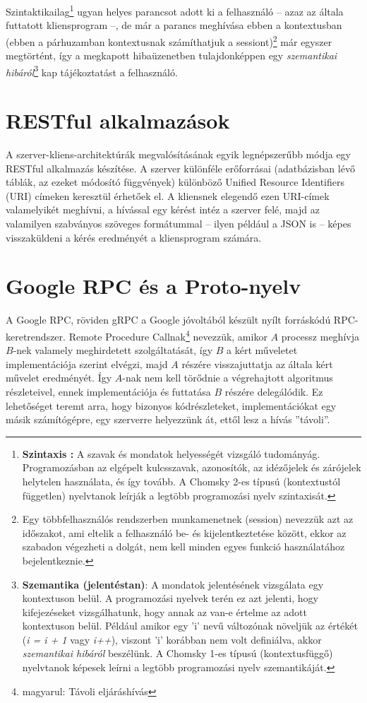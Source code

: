 \documentclass[tocnopagenum]{thesis-ekf}
\begin{document}
	Szintaktikailag\footnote{\textbf{Szintaxis :} A szavak és mondatok helyességét vizsgáló tudományág. Programozásban az elgépelt kulcsszavak, azonosítók, az idézőjelek és zárójelek helytelen használata, és így tovább. A Chomsky 2-es típusú (kontextustól független) nyelvtanok leírják a legtöbb programozási nyelv szintaxisát.} ugyan helyes parancsot adott ki a felhasználó -- azaz az általa futtatott kliensprogram --, de már a parancs meghívása ebben a kontextusban (ebben a párhuzamban kontextusnak számíthatjuk a sessiont)\footnote{Egy többfelhasználós rendszerben munkamenetnek (session) nevezzük azt az időszakot, ami eltelik a felhasználó be- és kijelentkeztetése között, ekkor az szabadon végezheti a dolgát, nem kell minden egyes funkció használatához bejelentkeznie.} már egyszer megtörtént, így a megkapott hibaüzenetben tulajdonképpen egy \textit{szemantikai hibáról}\footnote{\textbf{Szemantika (jelentéstan)}: A mondatok jelentésének vizsgálata egy kontextuson belül. A programozási nyelvek terén ez azt jelenti, hogy kifejezéseket vizsgálhatunk, hogy annak az van-e értelme az adott kontextuson belül. Például amikor egy 'i' nevű változónak növeljük az értékét (\textit{i = i + 1} vagy \textit{i++}), viszont 'i' korábban nem volt definiálva, akkor \textit{szemantikai hibáról} beszélünk. A Chomsky 1-es típusú (kontextusfüggő) nyelvtanok képesek leírni a legtöbb programozási nyelv szemantikáját.} kap tájékoztatást a felhasználó. \cite{formnyelvek}
	
	\section{RESTful alkalmazások}
	\label{rest}
	A szerver-kliens-architektúrák megvalósításának egyik legnépszerűbb módja egy RESTful alkalmazás készítése. A szerver különféle erőforrásai (adatbázisban lévő táblák, az ezeket módosító függvények) különböző Unified Resource Identifiers (URI) címeken keresztül érhetőek el. A kliensnek elegendő ezen URI-címek valamelyikét meghívni, a hívással egy kérést intéz a szerver felé, majd az valamilyen szabványos szöveges formátummal -- ilyen például a JSON is -- képes visszaküldeni a kérés eredményét a kliensprogram számára.
	
	\section{Google RPC és a Proto-nyelv}
	\label{grpc}
	A Google RPC, röviden gRPC a Google jóvoltából készült nyílt forráskódú RPC-keretrendszer. Remote Procedure Callnak\footnote{magyarul: Távoli eljáráshívás} nevezzük, amikor $A$ processz meghívja $B$-nek valamely meghirdetett szolgáltatását, így $B$ a kért műveletet implementációja szerint elvégzi, majd $A$ részére visszajuttatja az általa kért művelet eredményét. Így $A$-nak nem kell törődnie a végrehajtott algoritmus részleteivel, ennek implementációja és futtatása $B$ részére delegálódik. Ez lehetőséget teremt arra, hogy bizonyos kódrészleteket, implementációkat egy másik számítógépre, egy szerverre helyezzünk át, ettől lesz a hívás ''távoli''.
	
\end{document}

